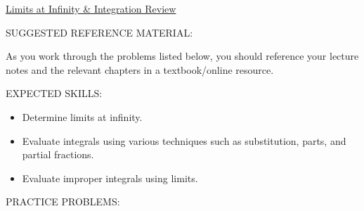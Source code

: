 \documentclass[12pt]{article}
\begin{document}
\begin{center}
\underline{\LARGE{Limits at Infinity \& Integration Review}}
\end{center}

\noindent SUGGESTED REFERENCE MATERIAL:

\medskip

\noindent As you work through the problems listed below, you should reference your lecture notes and the relevant chapters in a textbook/online resource.

\bigskip

\noindent EXPECTED SKILLS:

\medskip

\begin{itemize}[topsep=0pt]

\item Determine limits at infinity.

\item Evaluate integrals using various techniques such as substitution, parts, and partial fractions.

\item Evaluate improper integrals using limits.

\end{itemize}

\bigskip 

\noindent PRACTICE PROBLEMS:

\medskip

\end{document}
